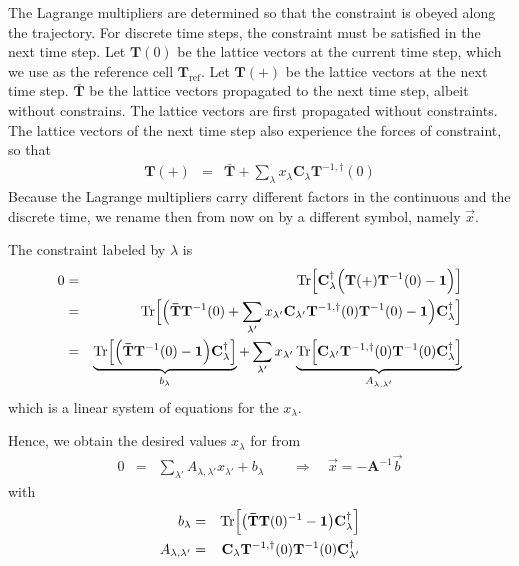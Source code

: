 \documentclass[final,12pt,makeidx,DIV=calc]{article}
\newcommand{\mat}[1]{\mathbf{#1}}
\newcommand{\Tr}{\mathrm{Tr}}      %
\begin{document}
{{{{{{The Lagrange multipliers are determined so that the constraint is
obeyed along the trajectory. For discrete time steps, the constraint
must be satisfied in the next time step.  Let $\mat{T}(0)$ be the
lattice vectors at the current time step, which we use as the
reference cell $\mat{T}_{\text{ref}}$. Let $\mat{T}(+)$ be the lattice
vectors at the next time step.  $\mat{\bar{T}}$ be the lattice vectors
propagated to the next time step, albeit without constrains.  The
lattice vectors are first propagated without constraints. The lattice
vectors of the next time step also experience the forces of
constraint, so that
\begin{eqnarray}
\mat{T}(+)&=&\mat{\bar{T}}+\sum_{\lambda}x_\lambda\mat{C}_\lambda
\mat{T}^{-1,\dagger}(0)
\end{eqnarray}
Because the Lagrange multipliers carry different factors in the
continuous and the discrete time, we rename then from now on by a
different symbol, namely $\vec{x}$. 

The constraint labeled by $\lambda$ is
\begin{eqnarray}
0&=&\Tr\Bigl[\mat{C}^\dagger_\lambda
                  \Bigl(\mat{T}(+)\mat{T}^{-1}(0)-\mat{1}\Bigr)
                  \Bigr]
\nonumber\\
&=& \Tr\Bigl[\Bigl(\mat{\bar{T}}\mat{T}^{-1}(0)
+\sum_{\lambda'}x_{\lambda'} \mat{C}_{\lambda'}\mat{T}^{-1,\dagger}(0)\mat{T}^{-1}(0)
-\mat{1}\Bigr)\mat{C}^\dagger_\lambda\Bigr]
\nonumber\\
&=& 
\underbrace{
\Tr\Bigl[\Bigl(\mat{\bar{T}}\mat{T}^{-1}(0)
-\mat{1}\Bigr)\mat{C}^\dagger_\lambda\Bigr]}_{b_\lambda}
+\sum_{\lambda'}x_{\lambda'} 
\underbrace{
\Tr\Bigl[
\mat{C}_{\lambda'}\mat{T}^{-1,\dagger}(0)\mat{T}^{-1}(0)
\mat{C}^\dagger_\lambda\Bigr]
}_{A_{\lambda,\lambda'}}
\end{eqnarray}
which is a linear system of equations for the $x_\lambda$.

Hence, we obtain the desired values $x_\lambda$ for from
  \begin{eqnarray}
0&=&\sum_{\lambda'}A_{\lambda,\lambda'}x_{\lambda'}+b_\lambda 
\qquad\Rightarrow\quad \vec{x}=-\mat{A}^{-1}\vec{b}
  \end{eqnarray}
with
  \begin{eqnarray}
    b_\lambda&=&\Tr\Bigl[\bigl(\mat{\bar{T}}\mat{T}(0)^{-1}-\mat{1}\bigr)
                      \mat{C}_\lambda^\dagger\Bigr]
 \nonumber\\
    A_{\lambda,\lambda'}
        &=&\mat{C}_\lambda \mat{T}^{-1,\dagger}(0)\mat{T}^{-1}(0)\mat{C}^\dagger_{\lambda'}
  \end{eqnarray}



}}}}}}
\end{document}
